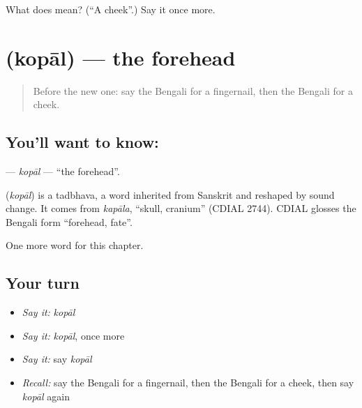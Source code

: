 \begin{tcolorbox}[breakable,colback=teal!4,colframe=teal!35!black,title={Before you move on}]
What does  mean? (\textquotedblleft{}A cheek\textquotedblright{}.) Say it once more.
\end{tcolorbox}
\section[\texorpdfstring{\bn{কপাল} (kopāl)}{কপাল (kopāl)}]{ (kopāl) — the forehead}

\label{lesson:BN-C124-kopal}



\begin{quote}
Before the new one: say the Bengali for a fingernail, then the Bengali for a cheek.
\end{quote}

\subsection*{You'll want to know: }
\textbf{} — \emph{kopāl} — \textquotedblleft{}the forehead\textquotedblright{}.

\begin{cousinweb}
\textbf{} (\emph{kopāl}) is a tadbhava, a word inherited from Sanskrit and reshaped by sound change. It comes from \emph{kapāla}, \textquotedblleft{}skull, cranium\textquotedblright{} (CDIAL 2744). CDIAL glosses the Bengali form \textquotedblleft{}forehead, fate\textquotedblright{}.
\end{cousinweb}

\begin{grammarlens}[title={What you've built}]
One more word for this chapter.
\end{grammarlens}

\subsection*{Your turn}
\begin{itemize}
\raggedright
  \item \emph{Say it:} \emph{kopāl}
  \item \emph{Say it:} \emph{kopāl}, once more
  \item \emph{Say it:} say \emph{kopāl}
  \item \emph{Recall:} say the Bengali for a fingernail, then the Bengali for a cheek, then say \emph{kopāl} again
\end{itemize}

